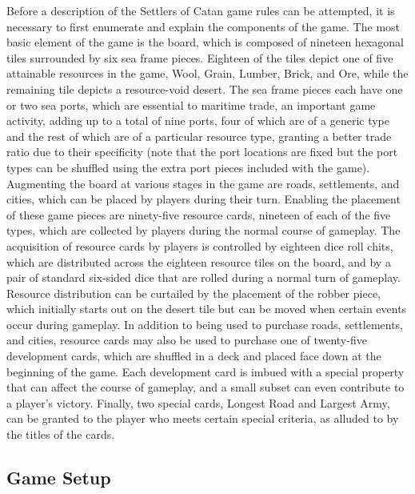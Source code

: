 \documentclass[pageno]{jpaper}
\begin{document}
\begin{doublespacing}
Before a description of the Settlers of Catan game rules can be attempted, it is necessary to first enumerate and explain the components of the game. The most basic element of the game is the board, which is composed of nineteen hexagonal tiles surrounded by six sea frame pieces. Eighteen of the tiles depict one of five attainable resources in the game, Wool, Grain, Lumber, Brick, and Ore, while the remaining tile depicts a resource-void desert. The sea frame pieces each have one or two sea ports, which are essential to maritime trade, an important game activity, adding up to a total of nine ports, four of which are of a generic type and the rest of which are of a particular resource type, granting a better trade ratio due to their specificity (note that the port locations are fixed but the port types can be shuffled using the extra port pieces included with the game). Augmenting the board at various stages in the game are roads, settlements, and cities, which can be placed by players during their turn. Enabling the placement of these game pieces are ninety-five resource cards, nineteen of each of the five types, which are collected by players during the normal course of gameplay. The acquisition of resource cards by players is controlled by eighteen dice roll chits, which are distributed across the eighteen resource tiles on the board, and by a pair of standard six-sided dice that are rolled during a normal turn of gameplay. Resource distribution can be curtailed by the placement of the robber piece, which initially starts out on the desert tile but can be moved when certain events occur during gameplay. In addition to being used to purchase roads, settlements, and cities, resource cards may also be used to purchase one of twenty-five development cards, which are shuffled in a deck and placed face down at the beginning of the game. Each development card is imbued with a special property that can affect the course of gameplay, and a small subset can even contribute to a player's victory. Finally, two special cards, Longest Road and Largest Army, can be granted to the player who meets certain special criteria, as alluded to by the titles of the cards.

\hypertarget{sec:game_setup}{}
\subsection{Game Setup}


\end{doublespacing}
\end{document}
